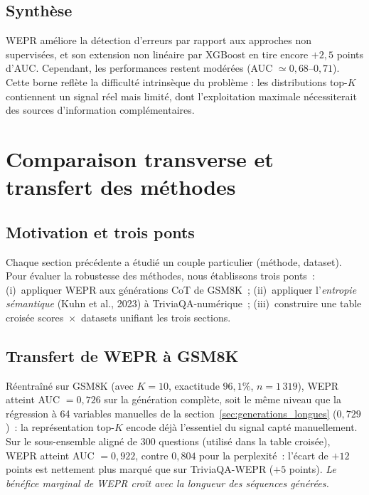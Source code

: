 \documentclass[12pt,a4paper]{article}
\begin{document}
\subsection{Synthèse}

WEPR améliore la détection d'erreurs par rapport aux approches non supervisées, et son extension non linéaire par XGBoost en tire encore $+2{,}5$ points d'AUC. Cependant, les performances restent modérées (AUC $\simeq 0{,}68$--$0{,}71$). Cette borne reflète la difficulté intrinsèque du problème : les distributions top-$K$ contiennent un signal réel mais limité, dont l'exploitation maximale nécessiterait des sources d'information complémentaires.


\section{Comparaison transverse et transfert des méthodes}
\label{sec:transverse}

\subsection{Motivation et trois ponts}

Chaque section précédente a étudié un couple particulier (méthode, dataset). Pour évaluer la robustesse des méthodes, nous établissons trois ponts~: (i)~appliquer WEPR aux générations CoT de GSM8K~; (ii)~appliquer l'\emph{entropie sémantique} (Kuhn et al., 2023) à TriviaQA-numérique~; (iii)~construire une table croisée scores~$\times$~datasets unifiant les trois sections.

\subsection{Transfert de WEPR à GSM8K}
\label{sec:transfert_wepr}

Réentraîné sur GSM8K (avec $K=10$, exactitude $96{,}1\%$, $n=1\,319$), WEPR atteint AUC $= 0{,}726$ sur la génération complète, soit le même niveau que la régression à 64 variables manuelles de la section~\ref{sec:generations_longues} ($0{,}729$)~: la représentation top-$K$ encode déjà l'essentiel du signal capté manuellement. Sur le sous-ensemble aligné de 300 questions (utilisé dans la table croisée), WEPR atteint AUC $= 0{,}922$, contre $0{,}804$ pour la perplexité~: l'écart de $+12$ points est nettement plus marqué que sur TriviaQA-WEPR ($+5$ points). \emph{Le bénéfice marginal de WEPR croît avec la longueur des séquences générées.}
\end{document}
